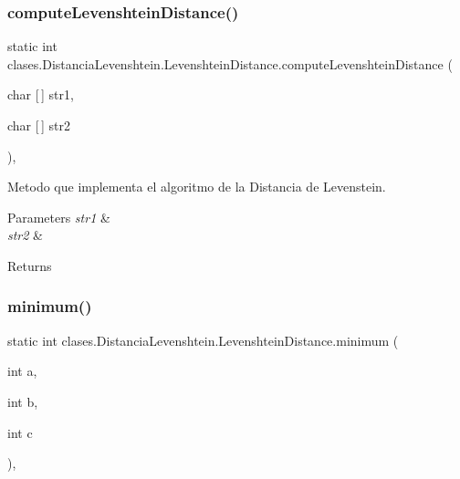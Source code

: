 \subsubsection{\texorpdfstring{compute\+Levenshtein\+Distance()}{computeLevenshteinDistance()}\hspace{0.1cm}{\footnotesize\ttfamily [2/2]}}
{\footnotesize\ttfamily static int clases.\+Distancia\+Levenshtein.\+Levenshtein\+Distance.\+compute\+Levenshtein\+Distance (\begin{DoxyParamCaption}\item[{char \mbox{[}$\,$\mbox{]}}]{str1,  }\item[{char \mbox{[}$\,$\mbox{]}}]{str2 }\end{DoxyParamCaption})\hspace{0.3cm}{\ttfamily [static]}, {\ttfamily [private]}}



Metodo que implementa el algoritmo de la Distancia de Levenstein. 


\begin{DoxyParams}{Parameters}
{\em str1} & \\
\hline
{\em str2} & \\
\hline
\end{DoxyParams}
\begin{DoxyReturn}{Returns}

\end{DoxyReturn}
\hypertarget{classclases_1_1_distancia_levenshtein_1_1_levenshtein_distance_a670f5fdf074856d2fa62eaedb9b36cad}{}\label{classclases_1_1_distancia_levenshtein_1_1_levenshtein_distance_a670f5fdf074856d2fa62eaedb9b36cad} 
\subsubsection{\texorpdfstring{minimum()}{minimum()}}
{\footnotesize\ttfamily static int clases.\+Distancia\+Levenshtein.\+Levenshtein\+Distance.\+minimum (\begin{DoxyParamCaption}\item[{int}]{a,  }\item[{int}]{b,  }\item[{int}]{c }\end{DoxyParamCaption})\hspace{0.3cm}{\ttfamily [static]}, {\ttfamily [private]}}



